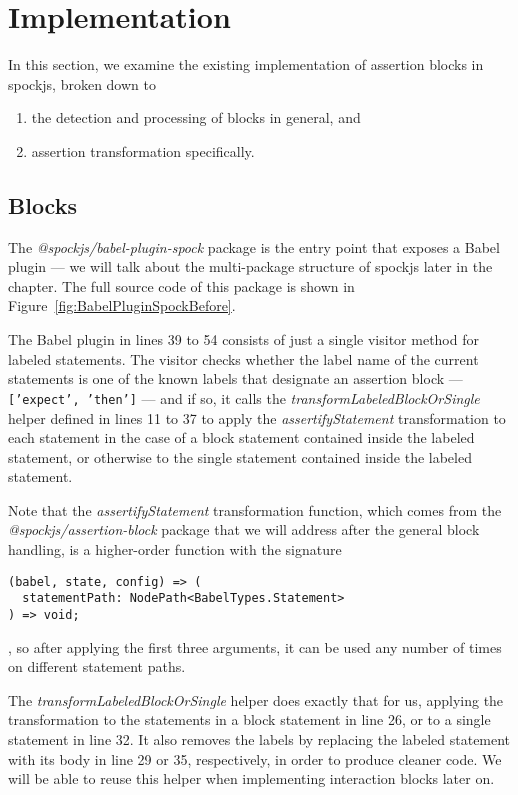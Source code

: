 \section{Implementation}
In this section, we examine the existing implementation of assertion blocks in spockjs, broken down to
\begin{enumerate}
  \item the detection and processing of blocks in general, and
  \item assertion transformation specifically.
\end{enumerate}

\subsection{Blocks}
The \textit{@spockjs/babel-plugin-spock} package is the entry point that exposes a Babel plugin ---
we will talk about the multi-package structure of spockjs later in the chapter.
The full source code of this package is shown in Figure~\ref{fig:BabelPluginSpockBefore}.

The Babel plugin in lines 39 to 54 consists of just a single visitor method for labeled statements.
The visitor checks whether the label name of the current statements
is one of the known labels that designate an assertion block
--- \texttt{['expect', 'then']} --- and if so,
it calls the \textit{transformLabeledBlockOrSingle} helper defined in lines 11 to 37
to apply the \textit{assertifyStatement} transformation
to each statement in the case of a block statement contained inside the labeled statement,
or otherwise to the single statement contained inside the labeled statement.

Note that the \textit{assertifyStatement} transformation function,
which comes from the \textit{@spockjs/assertion-block} package that we will address after the general block handling,
is a higher-order function with the signature
\begin{verbatim}
(babel, state, config) => (
  statementPath: NodePath<BabelTypes.Statement>
) => void;
\end{verbatim}
, so after applying the first three arguments,
it can be used any number of times on different statement paths.

The \textit{transformLabeledBlockOrSingle} helper does exactly that for us,
applying the transformation to the statements in a block statement in line 26,
or to a single statement in line 32.
It also removes the labels by
replacing the labeled statement with its body
in line 29 or 35, respectively,
in order to produce cleaner code.
We will be able to reuse this helper when implementing
interaction blocks later on.

